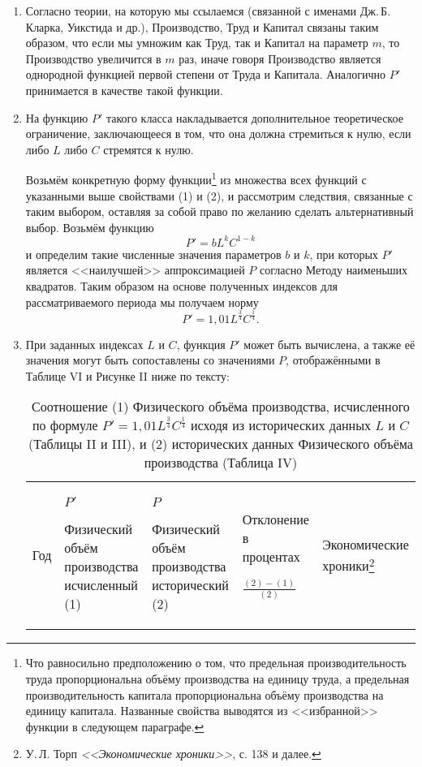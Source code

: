 \documentclass[leqno]{article}  %
\begin{document}
\begin{enumerate}[{(1)}]
\item Согласно теории, на которую мы ссылаемся (связанной с именами \linebreak Дж.\,Б.\,Кларка, Уикстида и др.), Производство, Труд и Капитал связаны таким образом, что если мы умножим как Труд, так и Капитал на параметр \(m\), то Производство увеличится в \(m\) раз, иначе говоря Производство является однородной функцией первой степени от Труда и Капитала. Аналогично \(P'\) принимается в качестве такой функции.
\item На функцию \(P'\) такого класса накладывается дополнительное теоретическое ограничение, заключающееся в том, что она должна стремиться к нулю, если либо \(L\) либо \(C\) стремятся к нулю.
\par
Возьмём конкретную форму функции\footnote{Что равносильно предположению о том, что предельная производительность труда пропорциональна объёму производства на единицу труда, а предельная производительность капитала пропорциональна объёму производства на единицу капитала. Названные свойства выводятся из <<избранной>> функции в следующем параграфе.} из множества всех функций с указанными выше свойствами (1) и (2), и рассмотрим следствия, связанные с таким выбором, оставляя за собой право по желанию сделать альтернативный выбор. Возьмём функцию
\[P'=bL^kC^{1-k}\]
и определим такие численные значения параметров \(b\) и \(k\), при которых \(P'\) является <<наилучшей>> аппроксимацией \(P\) согласно Методу наименьших квадратов. Таким образом на основе полученных индексов для рассматриваемого периода мы получаем норму
\[P'=1,01L^{\frac34}C^{\frac14}.\]
\par
\item При заданных индексах \(L\) и \(C\), функция \(P'\) может быть вычислена, а также её значения могут быть сопоставлены со значениями \(P\), отображёнными в Таблице VI и Рисунке II ниже по тексту:
\par
\begin{table}
\centering
\footnotesize{
\caption{Соотношение (1) Физического объёма производства, исчисленного по формуле \(P'=1,01L^{\frac34}C^{\frac14}\) исходя из исторических данных \(L\) и \(C\) (Таблицы II и III), и (2) исторических данных Физического объёма производства (Таблица IV)}%
\label{tab6}%
\begin{tabular}{p{}|p{}|p{}|p{}|p{}}
\hline
Год & \(P'\) \par Физический объём производства исчисленный (1) & \(P\) \par Физический объём производства исторический (2) & Отклонение в процентах \par \(\frac{(2)-(1)}{(2)}\) & Экономические хроники\footnote{У.\,Л. Торп \emph{<<Экономические хроники>>}, с. 138 и далее.} \\

\end{tabular}}
\end{table}
\end{enumerate}
\end{document}
